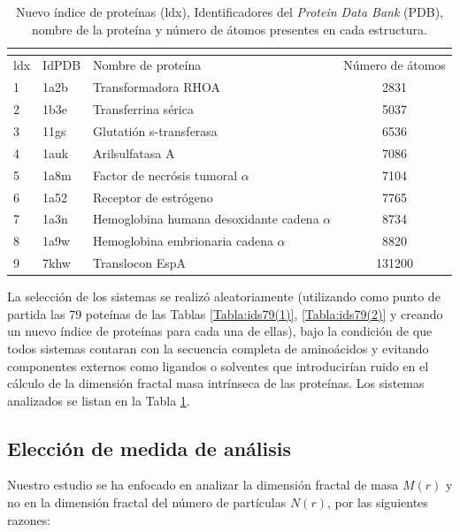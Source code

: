  	\begin{table}[H]
 		\centering
 		\begin{tabular}{||lllc||}
 			\multicolumn{4}{l}{} \\ 
 			\hline
 			ldx & IdPDB & Nombre de prote\'{i}na & N\'{u}mero de \'{a}tomos \\
 			\hline
 			 1  & 1a2b & Transformadora RHOA & 2831 \\
 			 2 & 1b3e & Transferrina s\'{e}rica & 5037 \\
 			 3 & 11gs & Glutati\'{o}n s-transferasa & 6536 \\ 
 			 4 & 1auk & Arilsulfatasa A & 7086 \\
 			 5 & 1a8m & Factor de necr\'{o}sis tumoral $\alpha$ & 7104 \\
 			 6 & 1a52 & Receptor de estr\'{o}geno & 7765 \\
 			 7 & 1a3n & Hemoglobina humana desoxidante cadena $\alpha$ & 8734 \\
 			 8 & 1a9w & Hemoglobina embrionaria cadena $\alpha$ & 8820 \\
 			 9 & 7khw & Translocon EspA & 131200 \\
 			\hline
 		\end{tabular}
 		\caption{Nuevo \'{i}ndice de prote\'{i}nas (ldx), Identificadores del \emph{Protein Data Bank} (PDB), nombre de la prote\'{i}na y n\'{u}mero de \'{a}tomos presentes en cada estructura.}
 		\label{Tabla:ids9}
 	\end{table}
 	
 	
 	
 	La selecci\'{o}n de los sistemas se realiz\'{o} aleatoriamente (utilizando como punto de partida las 79 pote\'{i}nas de las Tablas \ref{Tabla:ids79(1)}, \ref{Tabla:ids79(2)} y creando un nuevo \'{i}ndice de prote\'{i}nas para cada una de ellas), bajo la condici\'{o}n de que todos sistemas contaran con la secuencia completa de amino\'{a}cidos y evitando componentes externos como ligandos o solventes que introducir\'{i}an ruido en el c\'{a}lculo de la dimensi\'{o}n fractal masa intr\'{i}nseca de las prote\'{i}nas. Los sistemas analizados se listan en la Tabla \ref{Tabla:ids9}.
 
	
	\subsection{Elección de medida de análisis}
	
	 Nuestro estudio se ha enfocado en analizar la dimensi\'{o}n fractal de masa $M(r)$ y no en la dimensi\'{o}n fractal del n\'{u}mero de part\'{i}culas $N(r)$, por las siguientes razones:  
	 
